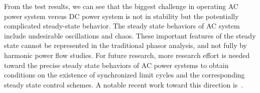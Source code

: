 From the test results, we can see that the biggest challenge in operating AC power system versus DC power system is not in stability but the potentially complicated steady-state behavior. %
The steady state behaviors of AC system include undesirable oscillations and chaos. These important features of the steady state cannot be represented in the traditional phasor analysis, and not fully by harmonic power flow studies. For future research, more research effort is needed toward the precise steady state behaviors of AC power systems to obtain conditions on the existence of synchronized limit cycles and the corresponding steady state control schemes. A notable recent work toward this direction is~\cite{gross2018steady}.